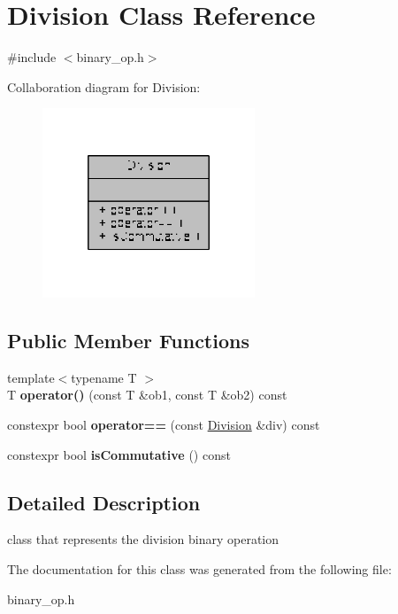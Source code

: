 \hypertarget{classDivision}{\section{Division Class Reference}
\label{classDivision}
}


{\ttfamily \#include $<$binary\-\_\-op.\-h$>$}



Collaboration diagram for Division\-:
\nopagebreak
\begin{figure}[H]
\begin{center}
\leavevmode
\includegraphics[width=180pt]{classDivision__coll__graph}
\end{center}
\end{figure}
\subsection*{Public Member Functions}
\begin{DoxyCompactItemize}
\item 
\hypertarget{classDivision_a5b6503a6d97997e1a45917dfb1a777f7}{{\footnotesize template$<$typename T $>$ }\\T {\bfseries operator()} (const T \&ob1, const T \&ob2) const }\label{classDivision_a5b6503a6d97997e1a45917dfb1a777f7}

\item 
\hypertarget{classDivision_af09d4b6662867c6fa7d18ba65653260b}{constexpr bool {\bfseries operator==} (const \hyperlink{classDivision}{Division} \&div) const }\label{classDivision_af09d4b6662867c6fa7d18ba65653260b}

\item 
\hypertarget{classDivision_a66a8c9c9902d1fcff048b9d19b373d6a}{constexpr bool {\bfseries is\-Commutative} () const }\label{classDivision_a66a8c9c9902d1fcff048b9d19b373d6a}

\end{DoxyCompactItemize}


\subsection{Detailed Description}
class that represents the division binary operation 

The documentation for this class was generated from the following file\-:\begin{DoxyCompactItemize}
\item 
binary\-\_\-op.\-h\end{DoxyCompactItemize}
